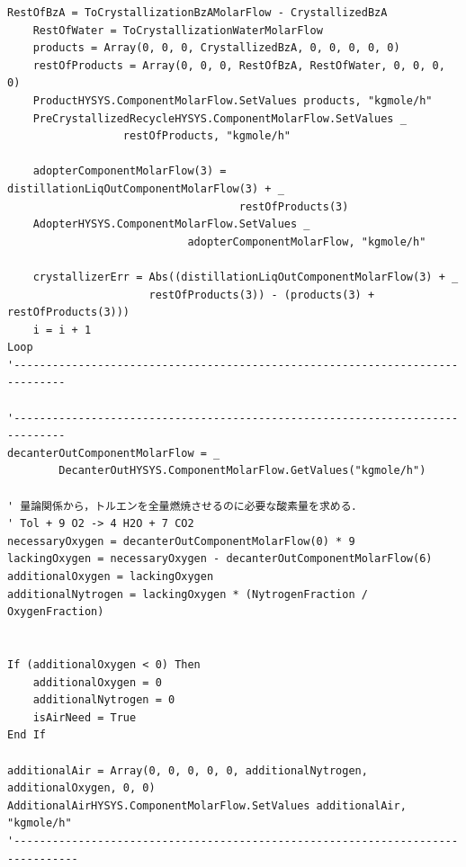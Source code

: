 \documentclass[a4j]{jsreport}
\begin{document}
\begin{lstlisting}[caption=HYSYSとpythonを繋ぐコード]
    RestOfBzA = ToCrystallizationBzAMolarFlow - CrystallizedBzA
    RestOfWater = ToCrystallizationWaterMolarFlow
    products = Array(0, 0, 0, CrystallizedBzA, 0, 0, 0, 0, 0)
    restOfProducts = Array(0, 0, 0, RestOfBzA, RestOfWater, 0, 0, 0, 0)
    ProductHYSYS.ComponentMolarFlow.SetValues products, "kgmole/h"
    PreCrystallizedRecycleHYSYS.ComponentMolarFlow.SetValues _
                  restOfProducts, "kgmole/h"

    adopterComponentMolarFlow(3) = distillationLiqOutComponentMolarFlow(3) + _
                                    restOfProducts(3)
    AdopterHYSYS.ComponentMolarFlow.SetValues _
                            adopterComponentMolarFlow, "kgmole/h"

    crystallizerErr = Abs((distillationLiqOutComponentMolarFlow(3) + _
                      restOfProducts(3)) - (products(3) + restOfProducts(3)))
    i = i + 1
Loop
'------------------------------------------------------------------------------

'------------------------------------------------------------------------------
decanterOutComponentMolarFlow = _
        DecanterOutHYSYS.ComponentMolarFlow.GetValues("kgmole/h")

' 量論関係から，トルエンを全量燃焼させるのに必要な酸素量を求める．
' Tol + 9 O2 -> 4 H2O + 7 CO2
necessaryOxygen = decanterOutComponentMolarFlow(0) * 9
lackingOxygen = necessaryOxygen - decanterOutComponentMolarFlow(6)
additionalOxygen = lackingOxygen
additionalNytrogen = lackingOxygen * (NytrogenFraction / OxygenFraction)


If (additionalOxygen < 0) Then
    additionalOxygen = 0
    additionalNytrogen = 0
    isAirNeed = True
End If

additionalAir = Array(0, 0, 0, 0, 0, additionalNytrogen, additionalOxygen, 0, 0)
AdditionalAirHYSYS.ComponentMolarFlow.SetValues additionalAir, "kgmole/h"
'--------------------------------------------------------------------------------


\end{lstlisting}
\end{document}
